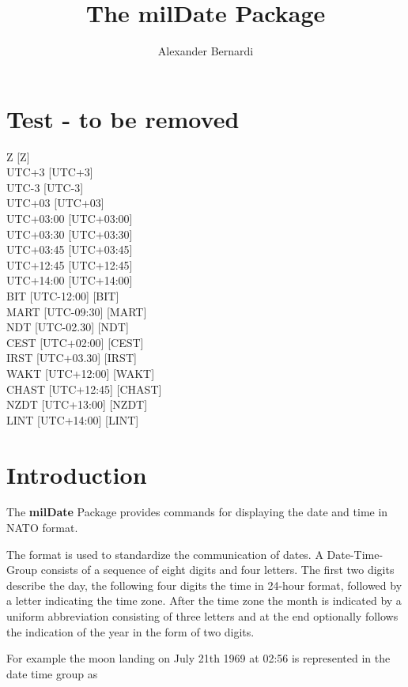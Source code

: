 \documentclass[a4paper,10pt]{scrarticle}
\title{\textnormal{The \textbf{milDate} Package}}
\author{Alexander Bernardi}
\begin{document}
\maketitle

\section{Test - to be removed}

Z [Z] \\
UTC+3 [UTC+3] \\
UTC-3 [UTC-3] \\
UTC+03 [UTC+03] \\
UTC+03:00 [UTC+03:00] \\
UTC+03:30 [UTC+03:30] \\
UTC+03:45 [UTC+03:45] \\
UTC+12:45 [UTC+12:45] \\
UTC+14:00 [UTC+14:00] \\
BIT [UTC-12:00] [BIT] \\
MART [UTC-09:30] [MART] \\
NDT [UTC-02.30] [NDT] \\
CEST [UTC+02:00] [CEST] \\
IRST [UTC+03.30] [IRST] \\
WAKT [UTC+12:00] [WAKT] \\
CHAST [UTC+12:45] [CHAST] \\
NZDT [UTC+13:00] [NZDT] \\
LINT [UTC+14:00] [LINT] \\



\section{Introduction}

The \textbf{milDate} Package provides commands for displaying the date and time in NATO format.\par
The format is used to standardize the communication of dates.
A Date-Time-Group consists of a sequence of eight digits and four letters. The first two digits describe the day, the following four digits the time in 24-hour format, followed by a letter indicating the time zone. After the time zone the month is indicated by a uniform abbreviation consisting of three letters and at the end optionally follows the indication of the year in the form of two digits. \par
For example the moon landing on July 21th 1969 at 02:56 is represented in the date time group as
\par\begin{center}
\end{center}\par
\end{document}
